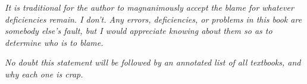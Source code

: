 \noindent%
\begin{minipage}{0.8\textwidth}
\raggedright\sffamily\fontsize{8.1}{11}\selectfont
{\itshape It is traditional for the author to magnanimously accept the blame for whatever deficiencies remain. I don’t. Any errors, deficiencies, or problems in this book are somebody else’s fault, but I would appreciate knowing about them so as to determine who is to blame.\par}
\end{minipage}\par\vspace{8pt}

\noindent%
\begin{minipage}{0.8\textwidth}
\raggedright\sffamily\fontsize{8.1}{11}\selectfont
{\itshape No doubt this statement will be followed by an annotated list of all textbooks, and why each one is crap.\par}\vspace{2pt}{\raggedleft \textemdash\ Adam Contini, MetaFilter, January 4, 2010\par}
\end{minipage}

